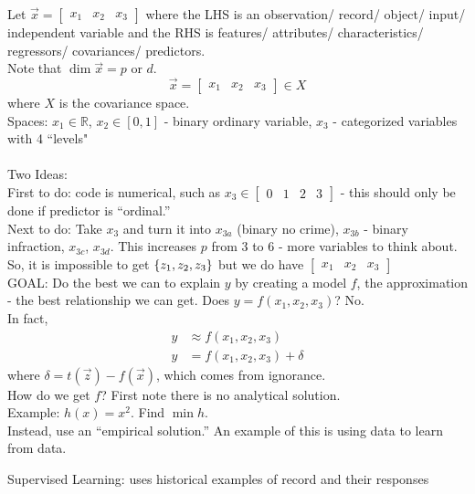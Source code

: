 \documentclass[12pt]{article}
\begin{document}
Let $\vec{x} = \begin{bmatrix} x_1 & x_2 & x_3 \end{bmatrix}$  where the LHS is an observation/ record/ object/ input/ independent variable and the RHS is features/ attributes/ characteristics/ regressors/ covariances/ predictors. \\
Note that $\dim{\vec{x}} = p$ or $d$.
$$ \vec{x} = \begin{bmatrix} x_1 & x_2 & x_3 \end{bmatrix} \in X $$ where $X$ is the covariance space. \\
Spaces: $x_1 \in \mathbb{R}$, $x_2 \in [0,1]$ - binary ordinary variable, $x_3$ - categorized variables with 4 ``levels" \\~\\
Two Ideas: \\
First to do: code is numerical, such as $x_3 \in \begin{bmatrix} 0 & 1 & 2 & 3 \end{bmatrix}$ - this should only be done if predictor is ``ordinal.'' \\
Next to do: Take $x_3$ and turn it into $x_{3a}$ (binary no crime), $x_{3b}$ - binary infraction, $x_{3c}$, $x_{3d}$. This increases $p$ from $3$ to $6$ - more variables to think about. \\
So, it is impossible to get $\left\{ z_1,z_2,z_3 \right\}$ but we do have $\begin{bmatrix} x_1 & x_2 & x_3 \end{bmatrix}$\\ 
GOAL: Do the best we can to explain $y$ by creating a model $f$, the approximation - the best relationship we can get. Does $y = f(x_1,x_2,x_3)$? No. \\
In fact, $$ \begin{aligned} y &\approx f(x_1,x_2,x_3) \\ y &= f(x_1, x_2,x_3) + \delta \end{aligned} $$ 
where $\delta = t(\vec{z}) - f(\vec{x})$, which comes from ignorance. \\
How do we get $f$? First note there is no analytical solution. \\
Example: $h(x) = x^2$. Find $\min{h}$. \\
Instead, use an ``empirical solution.'' An example of this is using data to learn from data. 
\begin{definition} Supervised Learning: uses historical examples of record and their responses \end{definition} 
\end{document}
